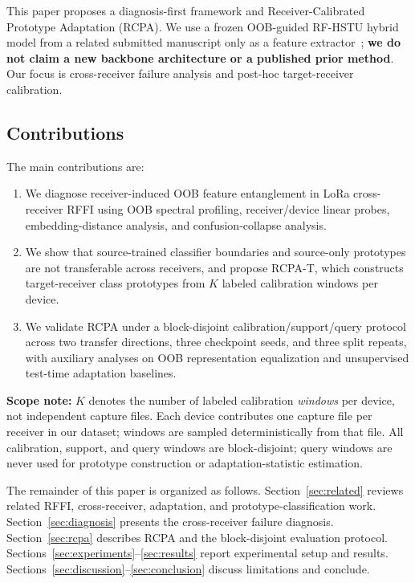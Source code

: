This paper proposes a diagnosis-first framework and Receiver-Calibrated Prototype Adaptation (RCPA).
We use a frozen OOB-guided RF-HSTU hybrid model from a related submitted manuscript only as a feature extractor~\cite{paper1_placeholder}; \textbf{we do not claim a new backbone architecture or a published prior method}.
Our focus is cross-receiver failure analysis and post-hoc target-receiver calibration.

\subsection{Contributions}
The main contributions are:
\begin{enumerate}
  \item We diagnose receiver-induced OOB feature entanglement in LoRa cross-receiver RFFI using OOB spectral profiling, receiver/device linear probes, embedding-distance analysis, and confusion-collapse analysis.
  \item We show that source-trained classifier boundaries and source-only prototypes are not transferable across receivers, and propose RCPA-T, which constructs target-receiver class prototypes from $K$ labeled calibration windows per device.
  \item We validate RCPA under a block-disjoint calibration/support/query protocol across two transfer directions, three checkpoint seeds, and three split repeats, with auxiliary analyses on OOB representation equalization and unsupervised test-time adaptation baselines.
\end{enumerate}

\textbf{Scope note:} $K$ denotes the number of labeled calibration \emph{windows} per device, not independent capture files.
Each device contributes one capture file per receiver in our dataset; windows are sampled deterministically from that file.
All calibration, support, and query windows are block-disjoint; query windows are never used for prototype construction or adaptation-statistic estimation.

The remainder of this paper is organized as follows.
Section~\ref{sec:related} reviews related RFFI, cross-receiver, adaptation, and prototype-classification work.
Section~\ref{sec:diagnosis} presents the cross-receiver failure diagnosis.
Section~\ref{sec:rcpa} describes RCPA and the block-disjoint evaluation protocol.
Sections~\ref{sec:experiments}--\ref{sec:results} report experimental setup and results.
Sections~\ref{sec:discussion}--\ref{sec:conclusion} discuss limitations and conclude.
